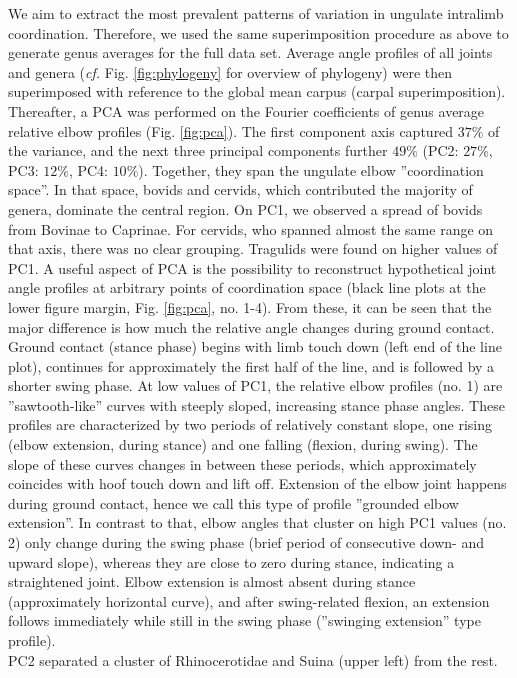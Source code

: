 We aim to extract the most prevalent patterns of variation in ungulate intralimb coordination.
Therefore, we used the same superimposition procedure as above to generate genus averages for the full data set.
Average angle profiles of all joints and genera (\textit{cf.} Fig. \ref*{fig:phylogeny} for overview of phylogeny) were  then superimposed with reference to the global mean carpus (carpal superimposition).
Thereafter, a PCA was performed on the Fourier coefficients of genus average relative elbow profiles (Fig. \ref{fig:pca}).
The first component axis captured $37\%$ of the variance, and the next three principal components further $49\%$ (PC2: $27\%$, PC3: $12\%$, PC4: $10\%$).
Together, they span the ungulate elbow ''coordination space''.
In that space, bovids and cervids, which contributed the majority of genera, dominate the central region.
On PC1, we observed a spread of bovids from {Bovinae} to {Caprinae}.
For cervids, who spanned almost the same range on that axis, there was no clear grouping.
Tragulids were found on higher values of PC1.
A useful aspect of PCA is the possibility to reconstruct hypothetical joint angle profiles at arbitrary points of coordination space (black line plots at the lower figure margin, Fig. \ref{fig:pca}, no. 1-4).
From these, it can be seen that the major difference is how much the relative angle changes during ground contact.
Ground contact (stance phase) begins with limb touch down (left end of the line plot), continues for approximately the first half of the line, and is followed by a shorter swing phase.
At low values of PC1, the relative elbow profiles (no. 1) are ''sawtooth-like'' curves with steeply sloped, increasing stance phase angles.
These profiles are characterized by two periods of relatively constant slope, one rising (elbow extension, during stance) and one falling (flexion, during swing).
The slope of these curves changes in between these periods, which approximately coincides with hoof touch down and lift off.
Extension of the elbow joint happens during ground contact, hence we call this type of profile ''grounded elbow extension''.
In contrast to that, elbow angles that cluster on high PC1 values (no. 2) only change during the swing phase (brief period of consecutive down- and upward slope), whereas they are close to zero during stance, indicating a straightened joint.
Elbow extension is almost absent during stance (approximately horizontal curve), and after swing-related flexion, an extension follows immediately while still in the swing phase (''swinging extension'' type profile).
\\PC2 separated a cluster of Rhinocerotidae and Suina (upper left) from the rest.
